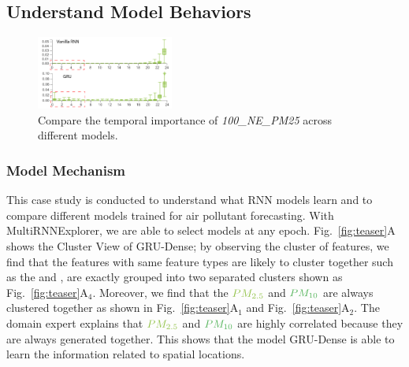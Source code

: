 \subsection{Understand Model Behaviors}
\begin{figure}[t]
	\centering
	\includegraphics[width=0.40\textwidth]{pictures/Evaluation/FI_comparison.pdf}
	\vspace{-3mm}
	\caption{Compare the temporal importance of \textit{100\_NE\_PM25}  across different models. 
	}
	\label{fig:gru_vs_rnn}
	\vspace{-4mm}
\end{figure}

\subsubsection{Model Mechanism}
This case study is conducted to understand what RNN models learn and to compare different models trained for air pollutant forecasting. 
With MultiRNNExplorer, we are able to select models at any epoch. Fig.~\ref{fig:teaser}A shows the Cluster View of GRU-Dense; by observing the cluster of features, we find that the features with same feature types are likely to cluster together such as the \textit{\color{RHColor}{Relative Humidity}} and \textit{\color{DPColor}{Dew-point}}, are exactly grouped into two separated clusters shown as Fig.~\ref{fig:teaser}A$_4$.
Moreover, we find that the $\color{PM25Color}{PM_{2.5}}$ and $\color{PM10Color}{PM_{10}}$ are always clustered together as shown in Fig.~\ref{fig:teaser}A$_1$ and Fig.~\ref{fig:teaser}A$_2$.
The domain expert explains that $\color{PM25Color}{PM_{2.5}}$ and $\color{PM10Color}{PM_{10}}$ are highly correlated because they are always generated together.
This  shows that the model GRU-Dense is able to learn the information related to spatial locations.  

